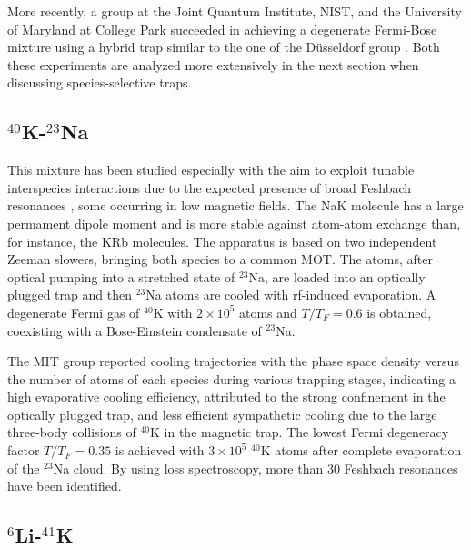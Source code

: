 \documentclass[pra,letterpaper,twocolumn,showpacs,superscriptaddress]{revtex4}
\begin{document}
More recently, a group at the Joint Quantum Institute, NIST, and the University of Maryland at College Park 
succeeded in achieving a degenerate Fermi-Bose mixture using a hybrid trap similar to the one of the D\"usseldorf group \cite{Vaidya2015}. 
Both these experiments are analyzed more extensively in the next section when discussing species-selective traps.

\subsection{${}^{40}$K-${}^{23}$Na}

 This mixture has been studied especially with the aim to exploit tunable interspecies interactions due to the 
expected presence of broad Feshbach resonances \cite{Park2012}, some occurring in low magnetic fields. 
The NaK molecule has a large permament dipole moment and is more stable against atom-atom exchange 
than, for instance, the KRb molecules. The apparatus is based on two independent Zeeman slowers,  
bringing both species to a common MOT. The atoms, after optical pumping into a stretched state of ${}^{23}$Na, 
are loaded into an optically plugged trap and then ${}^{23}$Na atoms are cooled with rf-induced evaporation. 
A degenerate Fermi gas of ${}^{40}$K with $2 \times 10^5$ atoms and $T/T_F=0.6$ is obtained, coexisting 
with a Bose-Einstein condensate of ${}^{23}$Na. 

The MIT group reported cooling trajectories with the phase space density versus the number of atoms of each species 
during various trapping stages, indicating a high evaporative cooling efficiency, attributed to the strong confinement in the 
optically plugged trap, and less efficient sympathetic cooling due to the large three-body collisions of ${}^40$K in the magnetic trap.
The lowest Fermi degeneracy factor $T/T_F=0.35$ is achieved with $3 \times 10^5$ ${}^{40}$K atoms after 
complete evaporation of the ${}^{23}$Na cloud. By using loss spectroscopy, more than 30 Feshbach resonances 
have been identified. 

\subsection{${}^{6}$Li-${}^{41}$K}
\end{document}
